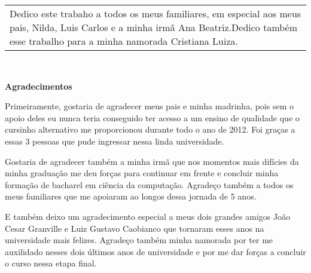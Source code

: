\documentclass[a4paper,12pt,twoside,openright]{report}
\begin{document}
\newpage
\thispagestyle{empty}
\vspace*{+480pt}
\hspace*{+160pt}
\begin{tabular}{p{200pt}}
	{\small Dedico este trabaho a todos os meus familiares, em especial aos meus pais, Nilda, Luis Carlos e a minha irm\~{a} Ana Beatriz.\newline Dedico tamb\'{e}m esse trabalho para a minha namorada Cristiana Luiza.}
\end{tabular}

\newpage\ \thispagestyle{empty} \newpage

\newpage
\thispagestyle{empty}
\begin{center}{\LARGE \textbf{Agradecimentos}}\end{center}
\vspace{+60pt}
\par Primeiramente, gostaria de agradecer meus pais e minha madrinha, pois sem o apoio deles eu nunca teria conseguido ter acesso a um ensino de qualidade que o cursinho alternativo me proporcionou durante todo o ano de 2012. Foi gra{\c c}as a essas 3 pessoas que pude ingressar nessa linda universidade.

\par Gostaria de agradecer tamb\'{e}m a minha irm\~{a} que nos momentos mais dif\'{i}cies da minha gradua{\c c}\~{a}o me deu for{\c c}as para continuar em frente e concluir minha forma{\c c}\~{a}o de bacharel em ci\^{e}ncia da computa{\c c}\~{a}o. Agrade{\c c}o tamb\'{e}m a todos os meus familiares que me apoiaram ao longos dessa jornada de 5 anos.

\par E tamb\'{e}m deixo um agradecimento especial a meus dois grandes amigos Jo\~{a}o Cesar Granville e Luiz Gustavo Caobianco que tornaram esses anos na universidade mais felizes. Agrade{\c c}o tamb\'{e}m minha namorada por ter me auxilidado nesses dois \'{u}ltimos anos de universidade e por me dar for{\c c}as a concluir o curso nessa etapa final.
\end{document}
